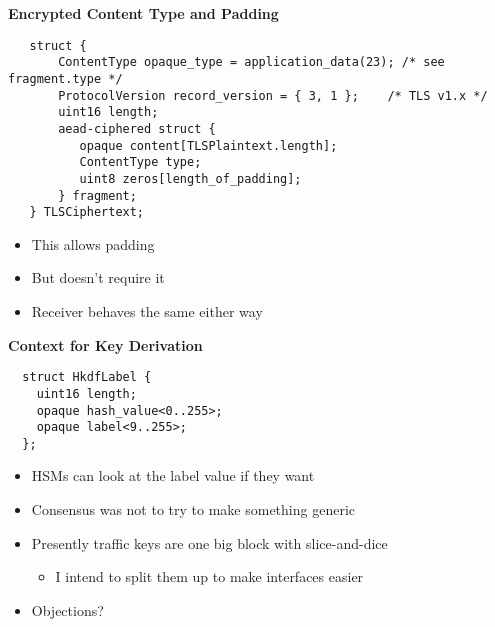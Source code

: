 \documentclass[helvetica]{seminar}
\newcommand{\heading}[1]{%
  \begin{center} 
    \large\bf 
    #1 
  \end{center} 
  \vspace{.4 in}}
\begin{document}
\begin{slide}
\heading{Encrypted Content Type and Padding}

\begin{footnotesize}
\begin{verbatim}
   struct {
       ContentType opaque_type = application_data(23); /* see fragment.type */
       ProtocolVersion record_version = { 3, 1 };    /* TLS v1.x */
       uint16 length;
       aead-ciphered struct {
          opaque content[TLSPlaintext.length];
          ContentType type;
          uint8 zeros[length_of_padding];
       } fragment;
   } TLSCiphertext;
\end{verbatim}
\end{footnotesize}

\begin{itemize}
\item This allows padding
\item But doesn't require it
\item Receiver behaves the same either way
\end{itemize}
\end{slide}


\begin{slide}
\heading{Context for Key Derivation}

\begin{footnotesize}
\begin{verbatim}
  struct HkdfLabel {
    uint16 length;
    opaque hash_value<0..255>;
    opaque label<9..255>;
  };
\end{verbatim}
\end{footnotesize}

\begin{itemize}
\item HSMs can look at the label value if they want
\item Consensus was not to try to make something generic
\item Presently traffic keys are one big block with slice-and-dice
  \begin{itemize}
  \item I intend to split them up to make interfaces easier
  \end{itemize}
\item Objections?
\end{itemize}

\end{slide}
\end{document}
